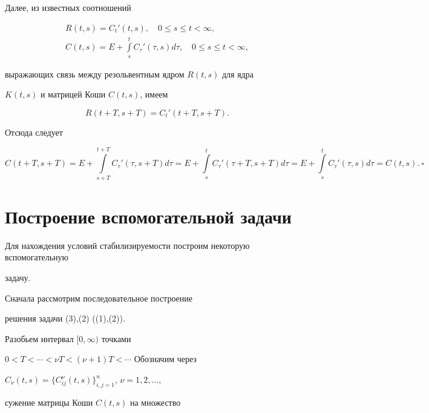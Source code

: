 Далее, из известных \cite{4} соотношений


\begin{gather*}


R(t,s)=C_t'(t,s), \quad 0\le s\le t<\infty ,\\


%


C(t,s)=E+\int\limits_s^tC_{\tau}'(\tau ,s)d\tau ,


\quad 0\le s\le t<\infty ,


\end{gather*}


выражающих связь между резольвентным ядром $R(t,s)$ для ядра


$K(t,s)$ и матрицей Коши $C(t,s)$, имеем


$$


R(t+T,s+T)=C_t'(t+T,s+T).


$$


Отсюда следует


$$


C(t{+}T,s{+}T)=E+\int\limits_{s+T}^{t+T}C_{\tau}'({\tau},s{+}T)d{\tau}=


E+\int\limits_s^tC_{\tau}'({\tau}{+}T,s{+}T)d{\tau}=


E+ \int\limits_s^tC_{\tau}'({\tau},s)d{\tau}


=C(t,s).\ \square


$$





\section{Построение вспомогательной задачи}





Для нахождения условий стабилизируемости построим некоторую вспомогательную


задачу.


Сначала рассмотрим последовательное построение


решения задачи (3),\;(2) ((1),\;(2)).





Разобьем интервал $[0,{\infty})$ точками


$0<T<\dotsb<{\nu}T<({\nu}+1)T<\dotsb$ Обозначим через


$C_{\nu}(t,s)=\{ C_{ij}^{\nu}(t,s)\}_{i,j=1}^n$, $\nu =1,2,\dotsc$,


сужение матрицы Коши $C(t,s)$ на множество


